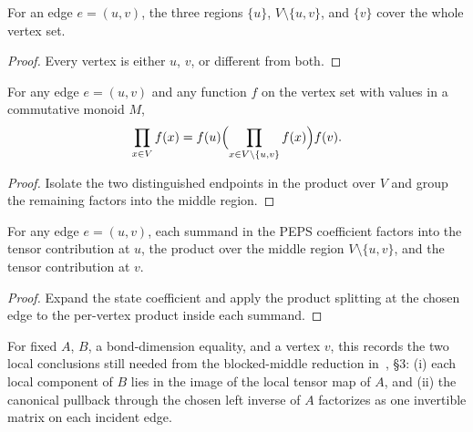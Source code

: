 \begin{theorem}%
    \label{thm:peps_edgeVertices_union}
    \leanok
    For an edge $e = (u,v)$, the three regions $\{u\}$,
    $V \setminus \{u,v\}$, and $\{v\}$ cover the whole vertex set.
\end{theorem}
\begin{proof}\leanok
    Every vertex is either $u$, $v$, or different from both.
\end{proof}

\begin{theorem}%
    \label{thm:peps_prod_univ_splitAtEdge}
    \leanok
    For any edge $e = (u,v)$ and any function $f$ on the vertex set with values
    in a commutative monoid $M$,
    \[
        \prod_{x \in V} f(x) = f(u) \Bigl(\prod_{x \in V \setminus \{u,v\}} f(x)\Bigr) f(v).
    \]
\end{theorem}
\begin{proof}\leanok
    Isolate the two distinguished endpoints in the product over $V$ and group
    the remaining factors into the middle region.
\end{proof}

\begin{theorem}%
    \label{thm:peps_stateCoeff_splitAtEdge}
    \leanok
    For any edge $e = (u,v)$, each summand in the PEPS coefficient factors into
    the tensor contribution at $u$, the product over the middle region
    $V \setminus \{u,v\}$, and the tensor contribution at $v$.
\end{theorem}
\begin{proof}\leanok
    Expand the state coefficient and apply the product splitting at the chosen
    edge to the per-vertex product inside each summand.
\end{proof}

\begin{definition}%
    \label{def:peps_hasLocalGaugeLift}
    \leanok
    For fixed $A$, $B$, a bond-dimension equality, and a vertex $v$, this
    records the two local conclusions still needed from the blocked-middle
    reduction in~\cite{Molnar2018NormalPEPS}, §3:
    (i) each local component of $B$ lies in the image of the local tensor map
    of $A$, and (ii) the canonical pullback through the chosen left inverse of
    $A$ factorizes as one invertible matrix on each incident edge.
\end{definition}

